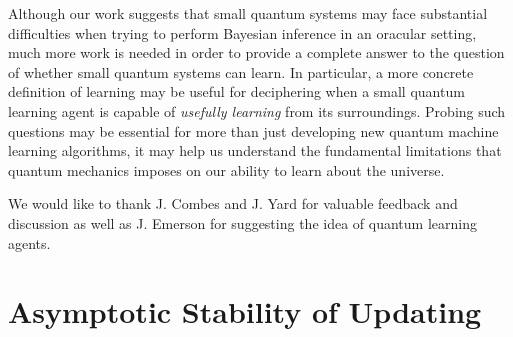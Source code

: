 \documentclass[aps,amsmath,onecolumn,amssymb,notitlepage]{revtex4-1}
\begin{document}
Although our work suggests that small quantum systems may face substantial difficulties when trying to perform Bayesian inference in an oracular setting, much more work is needed in order to provide a complete answer to the question of whether small quantum systems can learn.  In particular, a more concrete definition of learning may be useful for deciphering when a small quantum learning agent is capable of \emph{usefully learning} from its surroundings.  Probing such questions may be essential for more than just developing new quantum machine learning algorithms, it may help us understand the fundamental limitations that quantum mechanics imposes on our ability to learn about the universe.

\begin{acknowledgments}
We would like to thank J. Combes and J. Yard for valuable feedback and discussion as well as J. Emerson for suggesting the idea of quantum learning agents.
\end{acknowledgments}




\appendix
\section{Asymptotic Stability of Updating}\label{app:stability}
\end{document}
